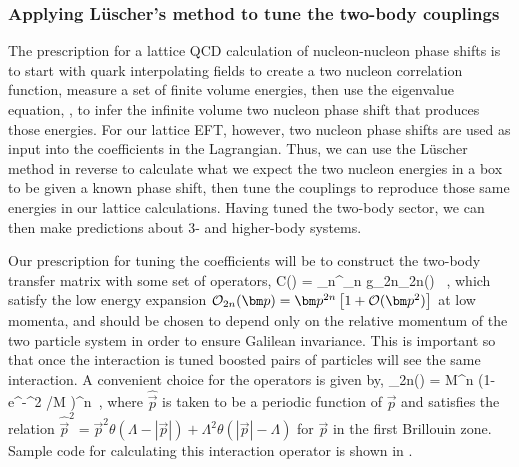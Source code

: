 \subsubsection{Applying L\"uscher's method to tune the two-body couplings}
The prescription for a lattice QCD calculation of nucleon-nucleon phase shifts is to start with quark interpolating fields to create a two nucleon correlation function, measure a set of finite volume energies, then use the eigenvalue equation, , to infer the infinite volume two nucleon phase shift that produces those energies. For our lattice EFT, however, two nucleon phase shifts are used as input into the coefficients in the Lagrangian. Thus, we can use the L\"uscher method in reverse to calculate what we expect the two nucleon energies in a box to be given a known phase shift, then tune the couplings to reproduce those same energies in our lattice calculations. Having tuned the two-body sector, we can then make predictions about 3- and higher-body systems.

Our prescription for tuning the coefficients will be to construct the two-body transfer matrix with some set of operators,
\beq
\label{eq:tuningcoef}
C() = \sum_n^{\Lambda_n} g_{2n}\calO_{2n}() \ ,
\eeq
which satisfy the low energy expansion $\calO_{2n}(\vec{p}) = \vec{p}^{2n} \left[ 1 + \calO(\vec{p}^2) \right]$ at low momenta, and should be chosen to depend only on the relative momentum of the two particle system in order to ensure Galilean invariance. This is important so that once the interaction is tuned boosted pairs of particles will see the same interaction. A convenient choice for the operators is given by,
\beq
\label{eq:Ofunc}
\calO_{2n}() =  M^n \left(1-e^{-^2 /M} \right)^n\ ,
\eeq
where $\hat{\vec{p}}$ is taken to be a periodic function of $\vec{p}$ and satisfies the relation $\hat{\vec{p}}^2 = \vec{p}^2 \theta(\Lambda-|\vec{p}|) + \Lambda^2  \theta(|\vec{p}| - \Lambda)$ for $\vec{p}$ in the first Brillouin zone. Sample code for calculating this interaction operator is shown in .

